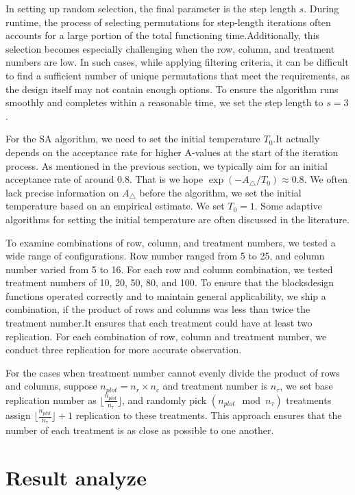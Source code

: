 \documentclass[
  a4paper,
  oneside,
  openany,
  12pt,
  onecolumn]{book}
\theoremstyle{definition}
\theoremstyle{definition}
\theoremstyle{plain}
\theoremstyle{remark}
\begin{document}
In setting up random selection, the final parameter is the step length
\(s\). During runtime, the process of selecting permutations for
step-length iterations often accounts for a large portion of the total
functioning time.Additionally, this selection becomes especially
challenging when the row, column, and treatment numbers are low. In such
cases, while applying filtering criteria, it can be difficult to find a
sufficient number of unique permutations that meet the requirements, as
the design itself may not contain enough options. To ensure the
algorithm runs smoothly and completes within a reasonable time, we set
the step length to \(s=3\).

For the SA algorithm, we need to set the initial temperature \(T_0\).It
actually depends on the acceptance rate for higher A-values at the start
of the iteration process. As mentioned in the previous section, we
typically aim for an initial acceptance rate of around 0.8. That is we
hope \(\exp(-A_{\bigtriangleup}/T_0) \approx 0.8\). We often lack
precise information on \(A_{\bigtriangleup}\) before the algorithm, we
set the initial temperature based on an empirical estimate. We set
\(T_0=1\). Some adaptive algorithms for setting the initial temperature
are often discussed in the literature.

To examine combinations of row, column, and treatment numbers, we tested
a wide range of configurations. Row number ranged from 5 to 25, and
column number varied from 5 to 16. For each row and column combination,
we tested treatment numbers of 10, 20, 50, 80, and 100. To ensure that
the blocksdesign functions operated correctly and to maintain general
applicability, we ship a combination, if the product of rows and columns
was less than twice the treatment number.It ensures that each treatment
could have at least two replication. For each combination of row, column
and treatment number, we conduct three replication for more accurate
observation.

For the cases when treatment number cannot evenly divide the product of
rows and columns, suppose \(n_{plot}=n_r\times n_c\) and treatment
number is \(n_{\tau}\), we set base replication number as
\(\lfloor \frac{n_{plot}}{n_{\tau}} \rfloor\), and randomly pick
\((n_{plot}\mod n_{\tau})\) treatments assign
\(\lfloor \frac{n_{plot}}{n_{\tau}} \rfloor+1\) replication to these
treatments. This approach ensures that the number of each treatment is
as close as possible to one another.

\section{Result analyze}\label{result-analyze}
\end{document}
